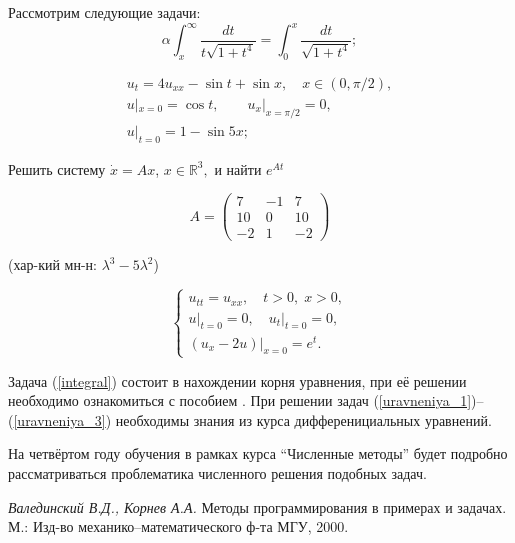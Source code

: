 \documentclass[12pt,english,russian]{article}
\begin{document}
Рассмотрим следующие задачи: 
\begin{equation}
	\label{integral}	
	\alpha \int_x^\infty \frac{dt}{t\sqrt{1+t^4}} = \int_0^x \frac{dt}{\sqrt{1+t^4}};
\end{equation}


\begin{equation}
		\label{uravneniya_1}
		\begin{array}{l}
			u_t=4u_{xx}-\sin t+\sin x,\quad x\in(0,\pi /2),\\
			u|_{x=0}=\cos t ,\qquad u_x|_{x=\pi /2}=0,\\
			u|_{t=0}=1-\sin{5x};
		\end{array}
	\end{equation}

Решить систему $\dot x=Ax$, $x\in\mathbb{R}^3,$ и найти $e^{At}$
	
	\begin{equation}
		A=\begin{pmatrix}
			 7 & -1 & 7\\
		     10 & 0 & 10\\
			 -2 & 1 & -2
		  \end{pmatrix}
	\end{equation}
	
(хар-кий мн-н: $\lambda^3-5\lambda^2$)
	
	\begin{equation}
		\label{uravneniya_3}
		\begin{cases}
			u_{tt}=u_{xx},\quad t>0,\;x>0,\\
			u|_{t=0}=0,\quad {u_t|}_{t=0}=0,\\
			(u_{x}-2u)|_{x=0}=e^{t}.
		\end{cases}
	\end{equation}

Задача (\ref{integral}) состоит в нахождении корня уравнения, при её решении необходимо ознакомиться с пособием \cite{Valedinskiy}.
При решении задач (\ref{uravneniya_1})--(\ref{uravneniya_3}) необходимы знания из курса дифференициальных уравнений.

На четвёртом году обучения в рамках курса ``Численные методы''{} будет подробно рассматриваться проблематика численного решения подобных задач.


	\begin{thebibliography}{1}
		\emph {Валединский В.Д., Корнев А.А.} Методы программирования в примерах и задачах. М.: Изд-во механико--математического ф-та МГУ, 2000.
	\end{thebibliography}
\end{document}
